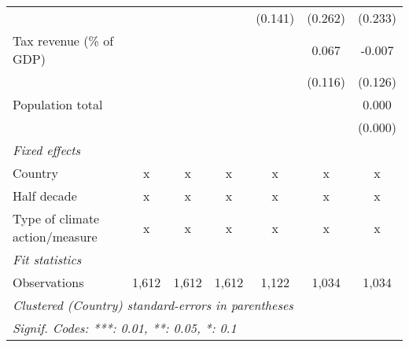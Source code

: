 \begin{tabular}{lcccccc}
                                                              &         &         &               & (0.141)       & (0.262)       & (0.233)\\   
   Tax revenue (\% of GDP)                                    &         &         &               &               & 0.067         & -0.007\\   
                                                              &         &         &               &               & (0.116)       & (0.126)\\   
   Population total                                           &         &         &               &               &               & 0.000\\   
                                                              &         &         &               &               &               & (0.000)\\   
   \emph{Fixed effects}\\
   Country                                                    & x       & x       & x             & x             & x             & x\\  
   Half decade                                                & x       & x       & x             & x             & x             & x\\  
   Type of climate action/measure                             & x       & x       & x             & x             & x             & x\\  
   \midrule \emph{Fit statistics}\\
   Observations                                               & 1,612   & 1,612   & 1,612         & 1,122         & 1,034         & 1,034\\  
   \midrule
   \multicolumn{7}{l}{\emph{Clustered (Country) standard-errors in parentheses}}\\
   \multicolumn{7}{l}{\emph{Signif. Codes: ***: 0.01, **: 0.05, *: 0.1}}\\
\end{tabular}
\par\endgroup


